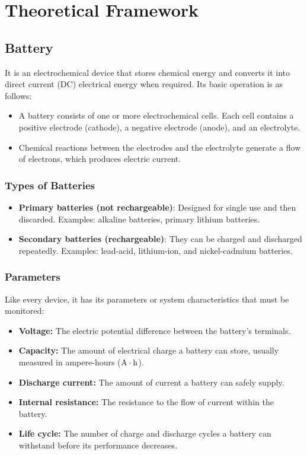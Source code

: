 \section{Theoretical Framework}

\subsection{Battery}

It is an electrochemical device that stores chemical energy and converts it into direct current (DC) electrical energy when required. Its basic operation is as follows:

\begin{itemize}
    \item A battery consists of one or more electrochemical cells. Each cell contains a positive electrode (cathode), a negative electrode (anode), and an electrolyte.
    \item Chemical reactions between the electrodes and the electrolyte generate a flow of electrons, which produces electric current.
\end{itemize}

\subsubsection{Types of Batteries}

\begin{itemize}
    \item \textbf{Primary batteries (not rechargeable)}: Designed for single use and then discarded. Examples: alkaline batteries, primary lithium batteries.
    \item \textbf{Secondary batteries (rechargeable)}: They can be charged and discharged repeatedly. Examples: lead-acid, lithium-ion, and nickel-cadmium batteries.
\end{itemize}

\subsubsection{Parameters}

Like every device, it has its parameters or system characteristics that must be monitored:

\begin{itemize}
    \item \textbf{Voltage:} The electric potential difference between the battery's terminals.
    \item \textbf{Capacity:} The amount of electrical charge a battery can store, usually measured in ampere-hours ($\ampere\cdot\hour$).
    \item \textbf{Discharge current:} The amount of current a battery can safely supply.
    \item \textbf{Internal resistance:} The resistance to the flow of current within the battery.
    \item \textbf{Life cycle:} The number of charge and discharge cycles a battery can withstand before its performance decreases.
\end{itemize}

